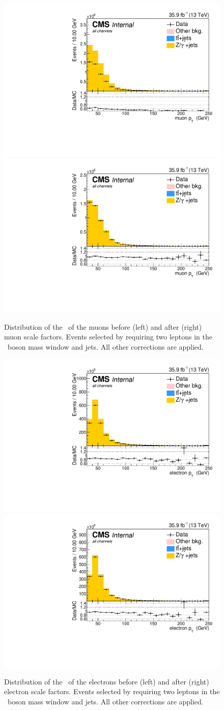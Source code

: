 \begin{figure}[htbp]
	\centering
	\includegraphics[width=0.49\linewidth]{5_Eventselection/Figures/Reweighing/2lepcontrol_dilep_MuPt_all_Stackbefore}
	\includegraphics[width=0.49\linewidth]{5_Eventselection/Figures/Reweighing/2lepcontrol_dilep_MuPt_all_Stack}
	\caption{Distribution of the \pt\ of the muons before (left) and after (right) muon scale factors.  Events selected by requiring two leptons in the \PZ\ boson mass window and jets. All other corrections are applied.}
	\label{fig:muSF}
\end{figure}
\begin{figure}[htbp]
	\centering
	\includegraphics[width=0.49\linewidth]{5_Eventselection/Figures/Reweighing/2lepcontrol_dilep_ElPt_all_Stackbefore}
	\includegraphics[width=0.49\linewidth]{5_Eventselection/Figures/Reweighing/2lepcontrol_dilep_ElPt_all_Stack}
	\caption{Distribution of the \pt\ of the electrons before (left) and after (right) electron scale factors.  Events selected by requiring two leptons in the \PZ\ boson mass window and jets. All other corrections are applied.}
	\label{fig:elSF}
\end{figure}

